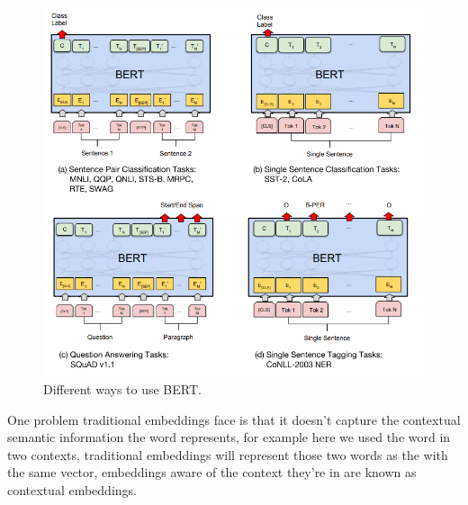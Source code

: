 \documentclass[12pt]{diazessay}
\newcounter{subsubsubsection}[subsubsection]
\begin{document}
            
            \begin{figure}[h]
                \includegraphics[scale=0.52]{Figures/BERT_uses.png}
                \caption{Different ways to use BERT.\cite{BERT}}
                \label{fig:different_ways_to_use_BERT}
            \end{figure}
            
            
            
            
            One problem traditional embeddings face is that it doesn't capture the contextual semantic information the word represents, for example  here we used the word  in two contexts, traditional embeddings will represent those two words as the with the same vector, embeddings aware of the context they're in are known as contextual embeddings.
            
\end{document}
